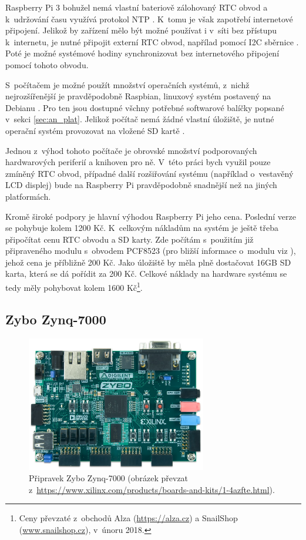 Raspberry Pi 3 bohužel nemá vlastní bateriově zálohovaný RTC obvod a k~udržování času využívá protokol NTP \cite{rpi_rtc_ada}. K~tomu je však zapotřebí internetové připojení. Jelikož by zařízení mělo být možné používat i v~síti bez přístupu k~internetu, je nutné připojit externí RTC obvod, napřílad pomocí I2C sběrnice \cite{rpi_rtc_ada}. Poté je možné systémové hodiny synchronizovat bez internetového připojení pomocí tohoto obvodu.

S~počítačem je možné použít množství operačních systémů, z~nichž nejrozšířenější je pravděpodobně Raspbian, linuxový systém postavený na Debianu \cite{raspbian_faq}. Pro ten jsou dostupné všchny potřebné softwarové balíčky popsané v~sekci \ref{sec:an_plat}. Jelikož počítač nemá žádné vlastní úložiště, je nutné operační systém provozovat na vložené SD kartě \cite{rpi_benchoff}.

Jednou z~výhod tohoto počítače je obrovské množství podporovaných hardwarových periferií a knihoven pro ně. V~této práci bych využil pouze zmíněný RTC obvod, případné další rozšiřování systému (například o~vestavěný LCD displej) bude na Raspberry Pi pravděpodobně snadnější než na jiných platformách.

Kromě široké podpory je hlavní výhodou Raspberry Pi jeho cena. Poslední verze se pohybuje kolem 1200 Kč. K~celkovým nákladům na systém je ještě třeba připočítat cenu RTC obvodu a SD karty. Zde počítám s~použitím již připraveného modulu s~obvodem PCF8523 (pro bližší informace o~modulu viz \cite{rpi_rtc_ada}), jehož cena je příbližně 200 Kč. Jako úložiště by měla plně dostačovat 16GB SD karta, která se dá pořídit za 200 Kč. Celkové náklady na hardware systému se tedy měly pohybovat kolem 1600 Kč\footnote{Ceny převzaté z~obchodů Alza (\url{https://alza.cz}) a SnailShop (\url{www.snailshop.cz}), v~únoru 2018.}.

\subsection{Zybo Zynq-7000}
\label{sec:an_zyb}

\begin{figure}[h!]
    \centering
    \includegraphics[width=0.7\textwidth]{images/zybo.jpg}
    \caption[Přípravek Zybo Zynq-7000]{Připravek Zybo Zynq-7000 (obrázek převzat z~\url{https://www.xilinx.com/products/boards-and-kits/1-4azfte.html}).}
    \label{fig:zybo}
\end{figure}

